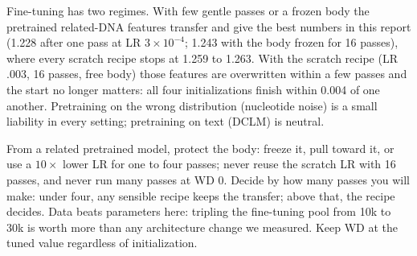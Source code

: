  Fine-tuning has two regimes. With few gentle passes or a frozen body the pretrained related-DNA features transfer and give the best numbers in this report (1.228 after one pass at LR $3\times10^{-4}$; 1.243 with the body frozen for 16 passes), where every scratch recipe stops at 1.259 to 1.263. With the scratch recipe (LR .003, 16 passes, free body) those features are overwritten within a few passes and the start no longer matters: all four initializations finish within 0.004 of one another. Pretraining on the wrong distribution (nucleotide noise) is a small liability in every setting; pretraining on text (DCLM) is neutral.

 From a related pretrained model, protect the body: freeze it, pull toward it, or use a $10\times$ lower LR for one to four passes; never reuse the scratch LR with 16 passes, and never run many passes at WD 0. Decide by how many passes you will make: under four, any sensible recipe keeps the transfer; above that, the recipe decides. Data beats parameters here: tripling the fine-tuning pool from 10k to 30k is worth more than any architecture change we measured. Keep WD at the tuned value regardless of initialization.
